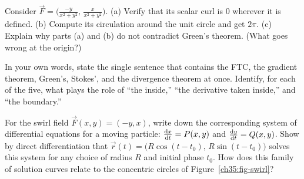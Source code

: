 \begin{exercise}
\label{ch35:exr-hole}
Consider $\vec F=\big(\frac{-y}{x^2+y^2},\,\frac{x}{x^2+y^2}\big)$. (a) Verify that
its scalar curl is $0$ wherever it is defined. (b) Compute its circulation around
the unit circle and get $2\pi$. (c) Explain why parts (a) and (b) do not contradict
Green's theorem. (What goes wrong at the origin?)
\end{exercise}

\begin{exercise}
\label{ch35:exr-unify}
In your own words, state the single sentence that contains the FTC, the gradient
theorem, Green's, Stokes', and the divergence theorem at once. Identify, for each of
the five, what plays the role of ``the inside,'' ``the derivative taken inside,''
and ``the boundary.''
\end{exercise}

\begin{exercise}
\label{ch35:exr-ode-bridge}
For the swirl field $\vec F(x,y) = (-y, x)$, write down the corresponding system of
differential equations for a moving particle: $\frac{\mathrm{d} x}{\mathrm{d} t} = P(x,y)$ and $\frac{\mathrm{d} y}{\mathrm{d} t} = Q(x,y)$.
Show by direct differentiation that $\vec r(t) = \big(R\cos(t-t_0),\, R\sin(t-t_0)\big)$
solves this system for any choice of radius $R$ and initial phase $t_0$. How does this
family of solution curves relate to the concentric circles of Figure~\ref{ch35:fig-swirl}?
\end{exercise}
